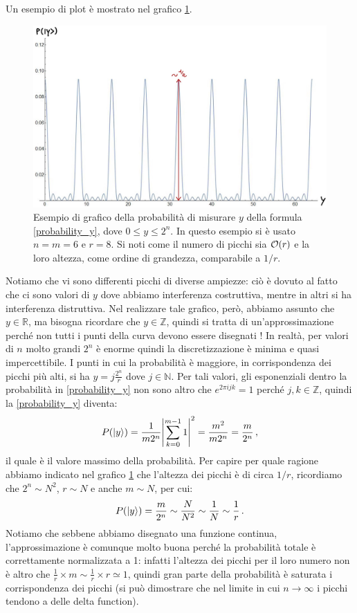 \noindent Un esempio di plot è mostrato nel grafico \ref{fig:probability_y}. 
\begin{figure}[!h]
    \centering
    \includegraphics[scale=0.325]{images/probability_y}
    \caption{Esempio di grafico della probabilità di misurare $y$ della formula \eqref{probability_y}, dove $0 \leqslant y \leqslant 2^n$. In questo esempio si è usato $n = m = 6$ e $r = 8$. Si noti come il numero di picchi sia $\order{r}$ e la loro altezza, come ordine di grandezza, comparabile a $1/r$.}
    \label{fig:probability_y}
\end{figure}
Notiamo che vi sono differenti picchi di diverse ampiezze: ciò è dovuto al fatto che ci sono valori di $y$ dove abbiamo interferenza costruttiva, mentre in altri si ha interferenza distruttiva. Nel realizzare tale grafico, però, abbiamo assunto che $y \in \mathbb{R}$, ma bisogna ricordare che $y\in \mathbb{Z}$, quindi si tratta di un'approssimazione perché non tutti i punti della curva devono essere disegnati ! In realtà, per valori di $n$ molto grandi $2^n$ è enorme quindi la discretizzazione è minima e quasi impercettibile. I punti in cui la probabilità è maggiore, in corrispondenza dei picchi più alti, si ha $y = j\frac{2^n}{r}$ dove $j \in \mathbb{N}$. Per tali valori, gli esponenziali dentro la probabilità in \eqref{probability_y} non sono altro che $e^{2\pi i j k}=1$ perché $j, k \in \mathbb{Z}$, quindi la \eqref{probability_y} diventa:
\begin{equation*}
    P(\ket{y}) = \frac{1}{m 2^n} \abs{\sum_{k=0}^{m-1} 1}^2 = \frac{m^2}{m2^n} = \frac{m}{2^n} \, ,
\end{equation*}
il quale è il valore massimo della probabilità. Per capire per quale ragione abbiamo indicato nel grafico \ref{fig:probability_y} che l'altezza dei picchi è di circa $1/r$, ricordiamo che $2^n \sim N^2$, $r \sim N$ e anche $m \sim N$, per cui:
\begin{equation*}
    P(\ket{y}) = \frac{m}{2^n} \sim \frac N{N^2} \sim \frac 1 N \sim \frac 1 r \, .
\end{equation*}
Notiamo che sebbene abbiamo disegnato una funzione continua, l'approssimazione è comunque molto buona perché la probabilità totale è correttamente normalizzata a 1: infatti l'altezza dei picchi per il loro numero non è altro che $\frac{1}{r} \times m \sim \frac{1}{r} \times r \simeq 1$, quindi gran parte della probabilità è saturata i corrispondenza dei picchi (si può dimostrare che nel limite in cui $n \to \infty$ i picchi tendono a delle delta function). 


